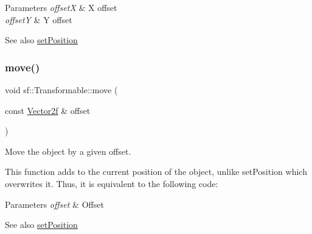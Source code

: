 \begin{DoxyParams}{Parameters}
{\em offsetX} & X offset \\
\hline
{\em offsetY} & Y offset\\
\hline
\end{DoxyParams}
\begin{DoxySeeAlso}{See also}
\mbox{\hyperlink{classsf_1_1_transformable_a4dbfb1a7c80688b0b4c477d706550208}{set\+Position}} \begin{DoxyVerb}\end{DoxyVerb}
 
\end{DoxySeeAlso}
\mbox{\label{classsf_1_1_transformable_ab9ca691522f6ddc1a40406849b87c469}} 
\subsubsection{\texorpdfstring{move()}{move()}\hspace{0.1cm}{\footnotesize\ttfamily [2/2]}}
{\footnotesize\ttfamily void sf\+::\+Transformable\+::move (\begin{DoxyParamCaption}\item[{const \mbox{\hyperlink{classsf_1_1_vector2}{Vector2f}} \&}]{offset }\end{DoxyParamCaption})}



Move the object by a given offset. 

This function adds to the current position of the object, unlike set\+Position which overwrites it. Thus, it is equivalent to the following code\+: 
\begin{DoxyCode}{0}
\end{DoxyCode}



\begin{DoxyParams}{Parameters}
{\em offset} & Offset\\
\hline
\end{DoxyParams}
\begin{DoxySeeAlso}{See also}
\mbox{\hyperlink{classsf_1_1_transformable_a4dbfb1a7c80688b0b4c477d706550208}{set\+Position}} \begin{DoxyVerb}\end{DoxyVerb}
 
\end{DoxySeeAlso}
\mbox{\label{classsf_1_1_transformable_af8a5ffddc0d93f238fee3bf8efe1ebda}} 
